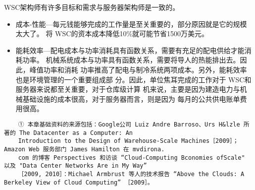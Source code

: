 WSC架构师有许多目标和需求与服务器架构师是一致的。

\begin{itemize}
    \item 成本-性能—每元钱能够完成的工作量是至关重要的，部分原因就是它的规模太大了。
    将 WSC的资本成本降低10\%就可能节省1500万美元。
    \item 能耗效率—配电成本与功率消耗具有函数关系，需要有充足的配电供给才能消耗功率。
    机械系统成本与功率具有函数关系，需要将导人的热能排出去。因此，峰值功率和消耗
    功率推高了配电与制冷系统两项成本。另外，能耗效率也是环境管理的一个重要组成部
    分。因此，单位焦耳完成的工作对于 WSC和服务器来说都至关重要，对于仓库级计算
    机来说，主要是因为建造电力与机械基础设施的成本很高，对于服务器而言，则是因为
    每月的公共供电账单费用很高。
\end{itemize}

\begin{verbatim}
    ① 本章基础资料的来源包括：Google公司 Luiz Andre Barroso、Urs H&lzle 所著的 The Datacenter as a Computer: An
    Introduction to the Design of Warehouse-Scale Machines［2009］；Amazon Web 服务部门 James Hamilton 在 mvdirona.
    com 的博客 Perspectives 和访谈 “Cloud-Computing Bconomies ofScale" 以及 "Data Center Networks Are in My Way”
    ［2009, 2010］：Michael Armbrust 等人的技术报告 “Above the Clouds: A Berkeley View of Cloud Computing” ［2009］。
\end{verbatim}

